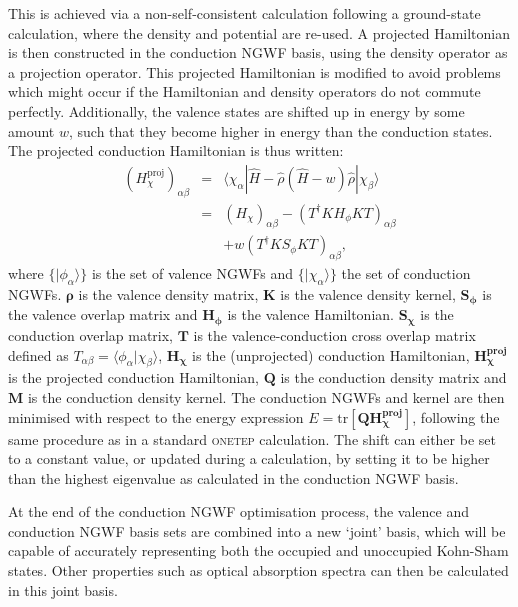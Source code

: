 \documentclass[a4paper,oneside,11pt]{article}
\begin{document}
This is achieved via a non-self-consistent calculation following a ground-state calculation, where the density and potential are re-used.  A projected Hamiltonian is then constructed in the conduction NGWF basis, using the density operator as a projection operator.  This projected Hamiltonian is modified to avoid problems which might occur if the Hamiltonian and density operators do not commute perfectly.  Additionally, the valence states are shifted up in energy by some amount $w$, such that they become higher in energy than the conduction states.  The projected conduction Hamiltonian is thus written:
%
\begin{eqnarray}
\left(H_\chi^{\textrm{proj}}\right)_{\alpha\beta}&=&\langle \chi_\alpha|\hat{H}-\hat{\rho}\left(\hat{H}-w\right)\hat{\rho}|\chi_\beta\rangle\\ \nonumber
&=&\left(H_\chi\right)_{\alpha\beta} -\left(T^\dag K H_\phi KT\right)_{\alpha\beta}\\ \nonumber
&&+w\left(T^\dag K S_\phi KT\right)_{\alpha\beta}, 
\end{eqnarray}
%
where $\{|\phi_{\alpha}\rangle\}$ is the set of valence NGWFs and $\{|\chi_{\alpha}\rangle\}$ the set of conduction NGWFs.  ${\bm{\rho}}$ is the valence density matrix, $\mathbf{K}$ is the valence density kernel, $\mathbf{S_{\phi}}$ is the valence overlap matrix and $\mathbf{H_{\phi}}$ is the valence Hamiltonian.  $\mathbf{S_{\chi}}$ is the conduction overlap matrix, $\mathbf{T}$ is the valence-conduction cross overlap matrix defined as $T_{\alpha\beta}=\langle \phi_{\alpha} | \chi_{\beta} \rangle$, $\mathbf{H_{\chi}}$ is the (unprojected) conduction Hamiltonian, $\mathbf{H_\chi^{\textrm{proj}}}$ is the projected conduction Hamiltonian, $\mathbf{Q}$ is the conduction density matrix and $\mathbf{M}$ is the conduction density kernel.  The conduction NGWFs and kernel are then minimised with respect to the energy expression $E=\text{tr}\left[\mathbf{Q}\mathbf{H_\chi^{\textrm{proj}}}\right]$, following the same procedure as in a standard \textsc{onetep} calculation.  The shift can either be set to a constant value, or updated during a calculation, by setting it to be higher than the highest eigenvalue as calculated in the conduction NGWF basis.

At the end of the conduction NGWF optimisation process, the valence and conduction NGWF basis sets are combined into a new `joint' basis, which will be capable of accurately representing both the occupied and unoccupied Kohn-Sham states.  Other properties such as optical absorption spectra can then be calculated in this joint basis.
\end{document}
